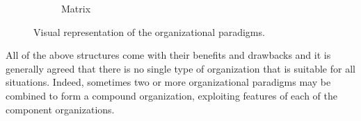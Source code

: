 \begin{figure}
\begin{subfigure}[h]{0.3\linewidth}
        \caption{Matrix}
        \label{fig:matrix}
    \end{subfigure}
    \caption{Visual representation of the organizational paradigms.}
    \label{fig:organizational-paradigms}
\end{figure}

All of the above structures come with their benefits and drawbacks
and it is generally agreed that there is no single type of organization that is suitable for all situations.
Indeed, sometimes two or more organizational paradigms may be combined to form a compound organization, exploiting features of each of the component organizations.



